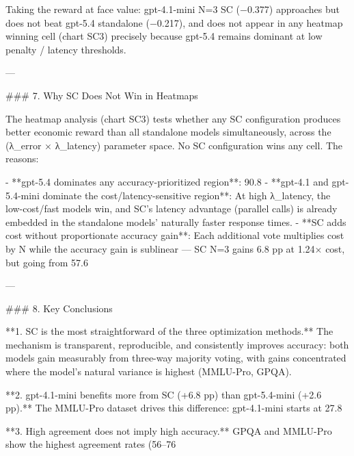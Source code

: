 Taking the reward at face value: gpt-4.1-mini N=3 SC (−0.377) approaches but does not beat gpt-5.4 standalone (−0.217), and does not appear in any heatmap winning cell (chart SC3) precisely because gpt-5.4 remains dominant at low penalty / latency thresholds.

---

### 7. Why SC Does Not Win in Heatmaps

The heatmap analysis (chart SC3) tests whether any SC configuration produces better economic reward than all standalone models simultaneously, across the (λ_error × λ_latency) parameter space. No SC configuration wins any cell. The reasons:

- **gpt-5.4 dominates any accuracy-prioritized region**: 90.8%
- **gpt-4.1 and gpt-5.4-mini dominate the cost/latency-sensitive region**: At high λ_latency, the low-cost/fast models win, and SC's latency advantage (parallel calls) is already embedded in the standalone models' naturally faster response times.
- **SC adds cost without proportionate accuracy gain**: Each additional vote multiplies cost by N while the accuracy gain is sublinear — SC N=3 gains 6.8 pp at 1.24× cost, but going from 57.6%

---

### 8. Key Conclusions

**1. SC is the most straightforward of the three optimization methods.** The mechanism is transparent, reproducible, and consistently improves accuracy: both models gain measurably from three-way majority voting, with gains concentrated where the model's natural variance is highest (MMLU-Pro, GPQA).

**2. gpt-4.1-mini benefits more from SC (+6.8 pp) than gpt-5.4-mini (+2.6 pp).** The MMLU-Pro dataset drives this difference: gpt-4.1-mini starts at 27.8%

**3. High agreement does not imply high accuracy.** GPQA and MMLU-Pro show the highest agreement rates (56–76%

